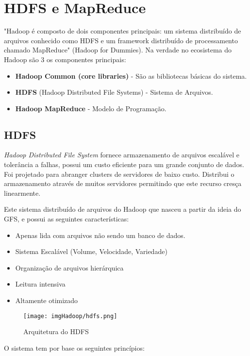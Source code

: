 \documentclass[a4paper,11pt]{article}
\begin{document}
\section{HDFS e MapReduce}
"Hadoop é composto de dois componentes principais: um sistema distribuído de arquivos conhecido como HDFS e um framework distribuído de processamento chamado MapReduce" (Hadoop for Dummies). Na verdade no ecosistema do Hadoop são 3 os componentes principais: \vspace{-1em}
\begin{itemize}
	\item \textbf{Hadoop Common (core libraries)} - São as bibliotecas básicas do sistema.
	\item \textbf{HDFS} (Hadoop Distributed File Systems) - Sistema de Arquivos.
	\item \textbf{Hadoop MapReduce} - Modelo de Programação.
\end{itemize}

\subsection{HDFS}
\textit{Hadoop Distributed File System} fornece armazenamento de arquivos escalável e tolerância a falhas, possui um custo eficiente para um grande conjunto de dados. Foi projetado para abranger clusters de servidores de baixo custo. Distribui o armazenamento através de muitos servidores permitindo que este recurso cresça linearmente.

Este sistema distribuído de arquivos do Hadoop que nasceu a partir da ideia do GFS, e possui as seguintes características: \vspace{-1em}
\begin{itemize}
	\item Apenas lida com arquivos não sendo um banco de dados.
	\item Sistema Escalável (Volume, Velocidade, Variedade)
	\item Organização de arquivos hierárquica
	\item Leitura intensiva
	\item Altamente otimizado
\end{itemize}
\begin{figure}[H]
	\centering
	\texttt{[image: imgHadoop/hdfs.png]}
	\caption{Arquitetura do HDFS}
\end{figure}

O sistema tem por base os seguintes princípios:
\end{document}
